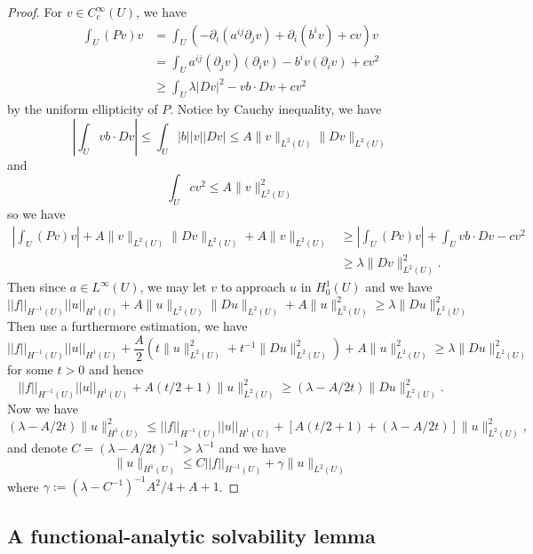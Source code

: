 \begin{proof}
    For $v \in C^{\infty}_c(U)$, we have
    \[
    \begin{aligned}
    \int_U (Pv)v &= \int_U (-\partial_i(a^{ij}\partial_j v) + \partial_i(b^i v) + cv)v \\
    &= \int_U a^{ij}(\partial_j v)(\partial_i v) - b^i v(\partial_i v) + cv^2 \\
    &\geq \int_U \lambda|D v|^2 - vb\cdot Dv + cv^2
    \end{aligned}
    \]
    by the uniform ellipticity of $P$. Notice by Cauchy inequality, we have
    \[
    \left\lvert \int_U vb\cdot Dv\right\rvert \leq \int_U |b||v||Dv| \leq A\lVert v\rVert_{L^2(U)}\lVert Dv\rVert_{L^2(U)}
    \]
    and
    \[\int_U cv^2 \leq A\lVert v\rVert_{L^2(U)}^2\]
    so we have
    \[
    \begin{aligned}
    \left|\int_U (Pv)v\right| + A\lVert v\rVert_{L^2(U)}\lVert Dv\rVert_{L^2(U)} + A\lVert v\rVert_{L^2(U)} &\geq \left|\int_U (Pv)v\right| + \int_U vb\cdot Dv - cv^2\\
    &\geq \lambda \lVert Dv\rVert_{L^2(U)}^2.
    \end{aligned}
    \]
    Then since $a \in L^{\infty}(U)$, we may let $v$ to approach $u$ in $H^1_0(U)$ and we have
    \[
    ||f||_{H^{-1}(U)}||u||_{H^{1}(U)} + A\lVert u\rVert_{L^2(U)}\lVert Du\rVert_{L^2(U)} + A\lVert u\rVert_{L^2(U)}^2 \geq \lambda \lVert Du\rVert_{L^2(U)}^2  
    \]
    Then use a furthermore estimation, we have
    \[
    ||f||_{H^{-1}(U)}||u||_{H^{1}(U)} + \dfrac A2(t\lVert u\rVert_{L^2(U)}^2 + t^{-1}\lVert Du\rVert_{L^2(U)}^2) + A\lVert u\rVert_{L^2(U)}^2 \geq \lambda \lVert Du\rVert_{L^2(U)}^2 
    \]
    for some $t > 0$ and hence
    \[
     ||f||_{H^{-1}(U)}||u||_{H^{1}(U)} + A(t/2 + 1)\lVert u\rVert_{L^2(U)}^2 \geq (\lambda - A/2t) \lVert Du\rVert_{L^2(U)}^2.
    \]
    Now we have
    \[
    (\lambda - A/2t) \lVert u\rVert_{H^1(U)}^2 \leq ||f||_{H^{-1}(U)}||u||_{H^{1}(U)} + [A(t/2 + 1)+(\lambda - A/2t)]\lVert u\rVert_{L^2(U)}^2,
    \]
    and denote $C = (\lambda - A/2t)^{-1 } > \lambda^{-1}$ and we have
    \[
    \lVert u\rVert_{H^1(U)} \leq C||f||_{H^{-1}(U)} + \gamma\lVert u\rVert_{L^2(U)}
    \]
    where $\gamma :=(\lambda-C^{-1})^{-1}A^2/4 + A + 1 $.
\end{proof}

\subsection{A functional-analytic solvability lemma}

